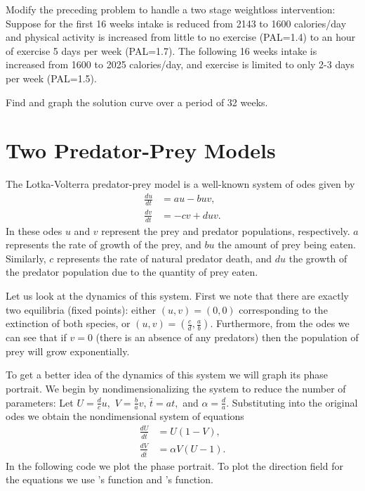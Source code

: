 \begin{problem}

Modify the preceding problem to handle a two stage weightloss intervention:
Suppose for the first 16 weeks intake is reduced from 2143 to 1600 calories/day and physical activity is increased from little to no exercise (PAL=1.4) to an hour of exercise 5 days per week (PAL=1.7). The following 16 weeks intake is increased from 1600 to 2025 calories/day, and exercise is limited to only 2-3 days per week (PAL=1.5).

Find and graph the solution curve over a period of 32 weeks.
\end{problem}



\section{Two Predator-Prey Models}
The Lotka-Volterra predator-prey model is a well-known 
system of odes given by 
\begin{align*}
	\frac{du}{dt} &= au - buv,\\
	\frac{dv}{dt} &= -cv + duv.
\end{align*}
In these odes $u$ and $v$ represent the prey and predator 
populations, respectively. $a$ represents the rate of growth 
of the prey, and $bu$ the amount of prey being eaten. 
Similarly, $c$ represents the rate of natural predator death, and $du$ the growth of the predator 
population due to the quantity of prey eaten.

Let us look at the dynamics of this system. First we note 
that there are exactly two equilibria (fixed points): either 
$(u,v) = (0,0)$ corresponding to the extinction of both 
species, or $(u,v) = (\frac{c}{d},\frac{a}{b})$.
 Furthermore, from the odes we can see that if $v=0$ (there
 is an absence of any predators) then the population of prey
 will grow exponentially.

To get a better idea of the dynamics of this system we will graph its phase portrait.
We begin by nondimensionalizing the system to reduce the number of parameters: 
Let $U = \frac{d}{c}u,$ $V = \frac{b}{a}v$, $\bar{t} = at,$ and  
$\alpha = \frac{d}{a}$. Substituting into the original odes we 
obtain the nondimensional system of equations
\begin{align*}
	\frac{dU}{d\bar{t}} &= U(1-V),\\
	\frac{dV}{d\bar{t}} &= \alpha V (U-1).
\end{align*}
In the following code we plot the phase portrait. To plot the direction field 
for the equations we use 's  function and 
's  function.


